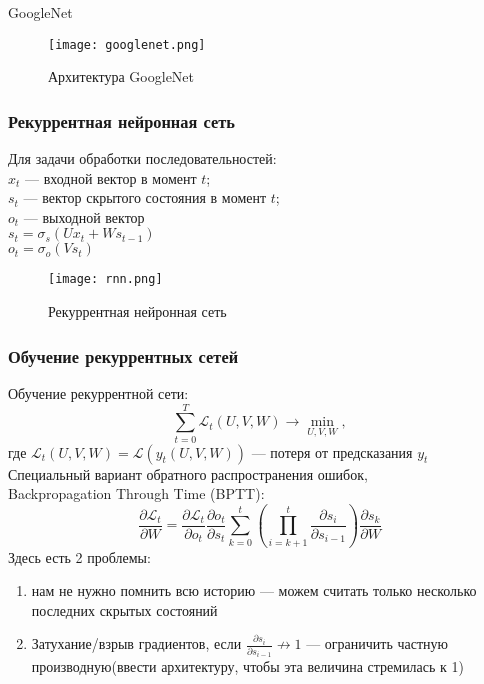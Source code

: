 \documentclass[unicode,9pt, pdf]{beamer}
\begin{document}
	\begin{frame}{GoogleNet}
	    \begin{figure}
	        \centering
	        \texttt{[image: googlenet.png]}
	        \caption{Архитектура GoogleNet}
	        \label{fig:my_label}
	    \end{figure}
	\end{frame}
	\begin{frame}
	    \frametitle{Рекуррентная нейронная сеть}
	    Для задачи обработки последовательностей: \\
	    \vspace{0.5cm}
	    $ x_t $ --- входной вектор в момент $ t $;\\
	    $ s_t $ --- вектор скрытого состояния в момент $t$;\\
	    $ o_t $ --- выходной вектор\\
	    \vspace{0.5cm}
	    $s_t = \sigma_s (Ux_t + Ws_{t-1})$\\
	    $o_t = \sigma_o (Vs_t)$
	    
	    \begin{figure}
	        \centering
	        \texttt{[image: rnn.png]}
	        \caption{Рекуррентная нейронная сеть}
	        \label{fig:my_label}
	    \end{figure}
	\end{frame}
	
	\begin{frame}
	\frametitle{Обучение рекуррентных сетей}
	 Обучение рекуррентной сети:
	    $$\sum_{t=0}^{T} \mathcal{L}_t (U, V, W) \rightarrow \min_{U, V, W},$$
	    где $\mathcal{L}_t (U, V, W) = \mathcal{L} (y_t(U, V, W))$ --- потеря от предсказания $y_t$\\
	\vspace{0.5cm}
	Специальный вариант обратного распространения ошибок, \\
	Backpropagation Through Time (BPTT): \\
	$$\dfrac{\partial \mathcal{L}_t}{\partial W} = \dfrac{\partial \mathcal{L}_t}{\partial o_t} \dfrac{\partial o_t}{\partial s_t} \sum_{k=0}^t \left( \prod_{i = k + 1}^t \dfrac{\partial s_i}{\partial s_{i-1}} \right) \dfrac{\partial s_k}{\partial W}$$
	Здесь есть 2 проблемы:
	\begin{enumerate}
	    \item нам не нужно помнить всю историю --- можем считать только несколько последних скрытых состояний\\
	    \item Затухание/взрыв градиентов, если  $\frac{\partial s_i}{\partial s_{i-1}} \not\rightarrow 1$ --- ограничить частную производную(ввести архитектуру, чтобы эта величина стремилась к 1)
	\end{enumerate}

    \end{frame}
    
\end{document}
